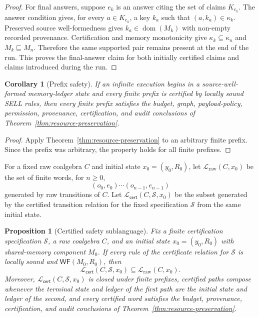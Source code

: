 \documentclass[a4paper,fleqn]{cas-sc}
\newtheorem{proposition}{Proposition}
\newtheorem{corollary}{Corollary}
\newcommand{\cert}{\mathsf{cert}}
\begin{document}
\begin{proof}
For final answers, suppose \(e_k\) is an answer citing the set of claims
\(K_{e_k}\). The answer condition gives, for every \(a\in K_{e_k}\), a key
\(k_a\) such that \((a,k_a)\in\kappa_k\). Preserved source well-formedness gives
\(k_a\in\operatorname{dom}(M_k)\) with non-empty recorded provenance.
Certification and memory monotonicity give \(\kappa_k\subseteq\kappa_n\) and
\(M_k\sqsubseteq M_n\). Therefore the same supported pair remains present at
the end of the run. This proves the final-answer claim for both initially
certified claims and claims introduced during the run.
\end{proof}

\begin{corollary}[Prefix safety]\label{cor:prefix-safety}
If an infinite execution begins in a source-well-formed memory-ledger state and
every finite prefix is certified by locally sound SELL rules, then every finite
prefix satisfies the budget, graph, payload-policy, permission, provenance,
certification, and audit conclusions of Theorem~\ref{thm:resource-preservation}.
\end{corollary}

\begin{proof}
Apply Theorem~\ref{thm:resource-preservation} to an arbitrary finite prefix. Since the prefix was arbitrary, the property holds for all finite prefixes.
\end{proof}

For a fixed raw coalgebra \(C\) and initial state \(x_0=(y_0,R_0)\), let \(\mathcal{L}_{\mathrm{raw}}(C,x_0)\) be the set of finite words, for \(n\ge0\),
\[
  (o_0,e_0)\cdots(o_{n-1},e_{n-1})
\]
generated by raw transitions of \(C\). Let
\(\mathcal{L}_{\cert}(C,\mathcal S,x_0)\) be the subset generated by the
certified transition relation for the fixed specification \(\mathcal S\) from
the same initial state.

\begin{proposition}[Certified safety sublanguage]\label{prop:certified-safety-sublanguage}
Fix a finite certification specification \(\mathcal S\), a raw coalgebra
\(C\), and an initial state \(x_0=(y_0,R_0)\) with shared-memory component
\(M_0\). If every rule of the certificate relation for \(\mathcal S\) is
locally sound and \(\mathsf{WF}(M_0,R_0)\), then
\[
  \mathcal{L}_{\cert}(C,\mathcal S,x_0)
  \subseteq
  \mathcal{L}_{\mathrm{raw}}(C,x_0).
\]
Moreover, \(\mathcal{L}_{\cert}(C,\mathcal S,x_0)\) is closed under finite prefixes, certified paths compose whenever the terminal state and ledger of the first path are the initial state and ledger of the second, and every certified word satisfies the budget, provenance, certification, and audit conclusions of Theorem~\ref{thm:resource-preservation}.
\end{proposition}
\end{document}
